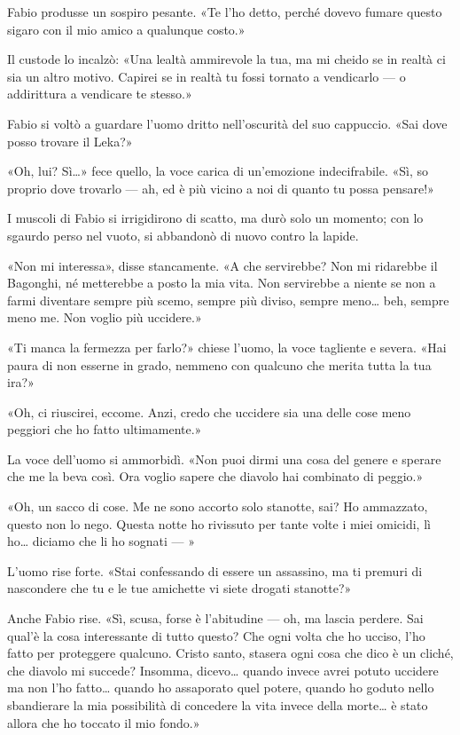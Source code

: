 Fabio produsse un sospiro pesante. «Te l'ho detto, perché dovevo fumare
questo sigaro con il mio amico a qualunque costo.»

Il custode lo incalzò: «Una lealtà ammirevole la tua, ma mi cheido se in
realtà ci sia un altro motivo. Capirei se in realtà tu fossi tornato a
vendicarlo --- o addirittura a vendicare te stesso.»

Fabio si voltò a guardare l'uomo dritto nell'oscurità del suo cappuccio.
«Sai dove posso trovare il Leka?»

«Oh, lui? Sì\ldots{}» fece quello, la voce carica di un'emozione
indecifrabile. «Sì, so proprio dove trovarlo --- ah, ed è più vicino a
noi di quanto tu possa pensare!»

I muscoli di Fabio si irrigidirono di scatto, ma durò solo un momento;
con lo sgaurdo perso nel vuoto, si abbandonò di nuovo contro la lapide.

«Non mi interessa», disse stancamente. «A che servirebbe? Non mi
ridarebbe il Bagonghi, né metterebbe a posto la mia vita. Non servirebbe
a niente se non a farmi diventare sempre più scemo, sempre più diviso,
sempre meno\ldots{} beh, sempre meno me. Non voglio più uccidere.»

«Ti manca la fermezza per farlo?» chiese l'uomo, la voce tagliente e
severa. «Hai paura di non esserne in grado, nemmeno con qualcuno che
merita tutta la tua ira?»

«Oh, ci riuscirei, eccome. Anzi, credo che uccidere sia una delle cose
meno peggiori che ho fatto ultimamente.»

La voce dell'uomo si ammorbidì. «Non puoi dirmi una cosa del genere e
sperare che me la beva così. Ora voglio sapere che diavolo hai combinato
di peggio.»

«Oh, un sacco di cose. Me ne sono accorto solo stanotte, sai? Ho
ammazzato, questo non lo nego. Questa notte ho rivissuto per tante volte
i miei omicidi, lì ho\ldots{} diciamo che li ho sognati --- »

L'uomo rise forte. «Stai confessando di essere un assassino, ma ti
premuri di nascondere che tu e le tue amichette vi siete drogati
stanotte?»

Anche Fabio rise. «Sì, scusa, forse è l'abitudine --- oh, ma lascia
perdere. Sai qual'è la cosa interessante di tutto questo? Che ogni volta
che ho ucciso, l'ho fatto per proteggere qualcuno. Cristo santo, stasera
ogni cosa che dico è un cliché, che diavolo mi succede? Insomma,
dicevo\ldots{} quando invece avrei potuto uccidere ma non l'ho
fatto\ldots{} quando ho assaporato quel potere, quando ho goduto nello
sbandierare la mia possibilità di concedere la vita invece della
morte\ldots{} è stato allora che ho toccato il mio fondo.»

